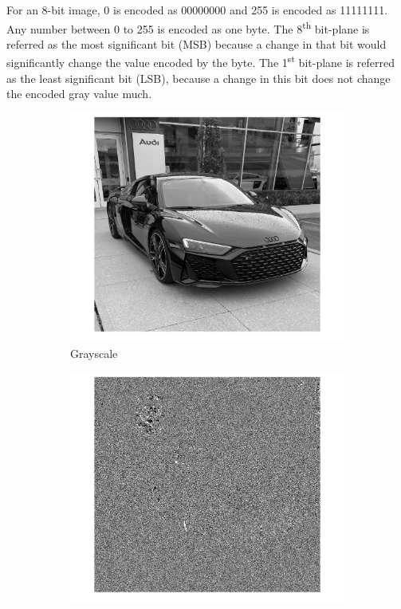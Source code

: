 \documentclass[conference]{IEEEtran}
\begin{document}
For an 8-bit image, 0 is encoded as 00000000 and 255 is encoded as 11111111. Any number between 0 to 255 is encoded as one byte. The 8\textsuperscript{th} bit-plane is referred as the most significant bit (MSB) because a change in that bit would significantly change the value encoded by the byte. The 1\textsuperscript{st} bit-plane is referred as the least significant bit (LSB), because a change in this bit does not change the encoded gray value much.

\begin{figure}[h!]
\centering
\begin{subfigure}[b]{0.3\linewidth}
\includegraphics[width=\linewidth]{images/img1.jpg}
\caption{Grayscale}
\end{subfigure}
\begin{subfigure}[b]{0.3\linewidth}
\includegraphics[width=\linewidth]{images/img4.jpg}

\end{subfigure}
\end{figure}
\end{document}
